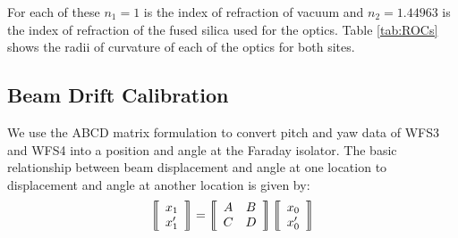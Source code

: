 For each of these $n_1 = 1$ is the index of refraction of vacuum and
$n_2 = 1.44963$ is the index of refraction of the fused silica used
for the optics. Table \ref{tab:ROCs} shows the radii of curvature of
each of the optics for both sites.



\subsection{Beam Drift Calibration}
We use the ABCD matrix formulation to convert pitch and yaw data of
WFS3 and WFS4 into a position and angle at the Faraday isolator. The
basic relationship between beam displacement and angle at one location
to displacement and angle at another location is given by:
\begin{equation}
\left \llbracket \begin{array}{c} 
x_1 \\
x^{\prime}_1 \end{array} \right\rrbracket =
\left\llbracket \begin{array}{c c}
A & B \\
C & D \end{array} \right\rrbracket
\left \llbracket \begin{array}{c} 
x_0 \\
x^{\prime}_0 \end{array} \right\rrbracket
\label{eq:abcd}
\end{equation}

